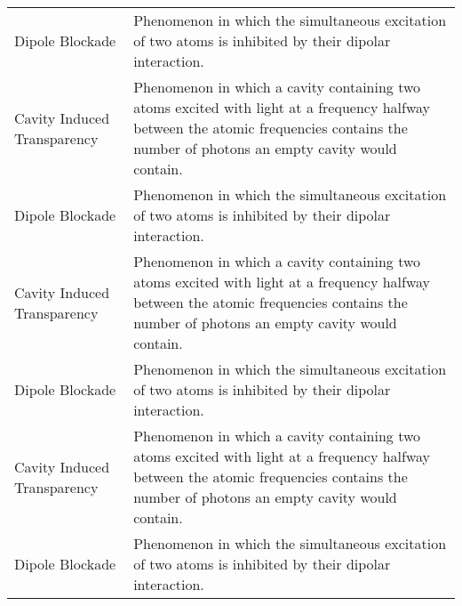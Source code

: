 \begin{center}
\begin{longtable}{l p{}}
        Dipole Blockade             & Phenomenon in which the simultaneous excitation of two atoms is inhibited by their dipolar interaction.                                                                                  \\
        Cavity Induced Transparency & Phenomenon in which a cavity containing two atoms excited with light at a frequency halfway between the atomic frequencies contains the number of photons an empty cavity would contain. \\
        Dipole Blockade             & Phenomenon in which the simultaneous excitation of two atoms is inhibited by their dipolar interaction.                                                                                  \\
        Cavity Induced Transparency & Phenomenon in which a cavity containing two atoms excited with light at a frequency halfway between the atomic frequencies contains the number of photons an empty cavity would contain. \\
        Dipole Blockade             & Phenomenon in which the simultaneous excitation of two atoms is inhibited by their dipolar interaction.                                                                                  \\
        Cavity Induced Transparency & Phenomenon in which a cavity containing two atoms excited with light at a frequency halfway between the atomic frequencies contains the number of photons an empty cavity would contain. \\
        Dipole Blockade             & Phenomenon in which the simultaneous excitation of two atoms is inhibited by their dipolar interaction.
    \end{longtable}
\end{center}
